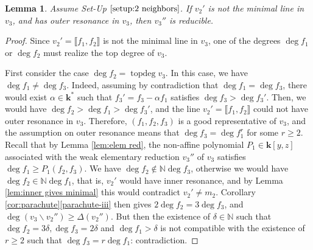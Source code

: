 \documentclass[reqno,oneside,11pt]{amsart}
\theoremstyle{plain}
\newtheorem{lemma}[theorem]{Lemma}
\theoremstyle{definition}
\newcommand{\N}{\mathbb{N}}
\newcommand{\K}{\mathbf{k}}
\DeclareMathOperator{\topdeg}{topdeg}
\newcommand{\llb}{\llbracket}
\newcommand{\rrb}{\rrbracket}
\renewcommand{\ge}{\geqslant}
\begin{document}
\begin{lemma} \label{lem:outer resonance}
Assume Set-Up $\ref{setup:2 neighbors}$.
If $v_2'$ is not the minimal line in $v_3$, and has outer resonance in $v_3$, then $v_3''$ is reducible.
\end{lemma}

\begin{proof}
Since $v_2' = \llb f_1, f_2\rrb$ is not the minimal line in $v_3$, one of the
degrees $\deg f_1$ or $\deg f_2$ must realize the top degree of $v_3$.

First consider the case $\deg f_2 = \topdeg v_3$.
In this case, we have $\deg f_1 \neq \deg f_3$.
Indeed, assuming by contradiction that $\deg f_1 = \deg f_3$, there would exist
$\alpha \in \K^*$ such that $f_3' = f_3 - \alpha f_1$ satisfies $\deg f_3 >
\deg f_3'$.
Then, we would have $\deg f_2 > \deg f_1 > \deg f_3'$, and the line $v_2' = \llb
f_1, f_2 \rrb$ could not have outer resonance in $v_3$.
Therefore, $(f_1, f_2, f_3)$ is a good representative of $v_3$, and the
assumption on outer resonance means that $\deg f_3 = \deg f_1^r$ for some $r \ge
2$.
Recall that by Lemma \ref{lem:elem red}, the non-affine polynomial $P_1 \in \K[y,z]$  associated with the weak elementary reduction $v_3''$ of $v_3$ satisfies $\deg f_1 \ge P_1(f_2,f_3)$.
We have $\deg f_2 \not\in \N \deg f_3$, otherwise we would have $\deg f_2 \in \N\deg f_1$, that is, $v_2'$ would have inner resonance, and by Lemma \ref{lem:inner gives minimal} this would contradict $v_2' \neq m_2$.
Corollary \ref{cor:parachute}\ref{parachute-iii} then gives $2\deg f_2 = 3 \deg
f_3$, and $\deg (v_3 \smallsetminus v_2'') \ge \Delta(v_2'')$.
But then the existence of $\delta \in \N$ such that $\deg f_2 = 3\delta, \deg
f_3 = 2\delta$ and  $\deg f_1 > \delta$ is not compatible with the existence of
$r \ge 2$ such that $\deg f_3 = r \deg f_1$: contradiction.


\end{proof}
\end{document}
